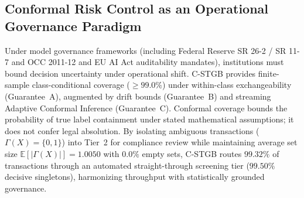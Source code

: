 \subsection{Conformal Risk Control as an Operational Governance Paradigm}
\label{sec:discussion_conformal_governance}
Under model governance frameworks (including Federal Reserve SR 26-2 / SR 11-7 and OCC 2011-12 \citep{fed2026sr262, occ201112} and EU AI Act auditability mandates), institutions must bound decision uncertainty under operational shift. C-STGB provides finite-sample class-conditional coverage ($\ge 99.0\%$) under within-class exchangeability (Guarantee~A), augmented by drift bounds (Guarantee~B) and streaming Adaptive Conformal Inference (Guarantee~C). Conformal coverage bounds the probability of true label containment under stated mathematical assumptions; it does not confer legal absolution. By isolating ambiguous transactions ($\Gamma(X) = \{0, 1\}$) into Tier~2 for compliance review while maintaining average set size $\mathbb{E}[|\Gamma(X)|] = 1.0050$ with $0.0\%$ empty sets, C-STGB routes $99.32\%$ of transactions through an automated straight-through screening tier ($99.50\%$ decisive singletons), harmonizing throughput with statistically grounded governance.

